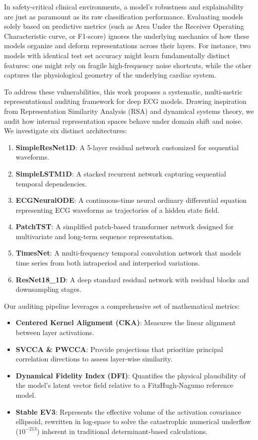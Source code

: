 \documentclass[twocolumn]{article}
\begin{document}
In safety-critical clinical environments, a model's robustness and explainability are just as paramount as its raw classification performance. Evaluating models solely based on predictive metrics (such as Area Under the Receiver Operating Characteristic curve, or F1-score) ignores the underlying mechanics of how these models organize and deform representations across their layers. For instance, two models with identical test set accuracy might learn fundamentally distinct features: one might rely on fragile high-frequency noise shortcuts, while the other captures the physiological geometry of the underlying cardiac system.

To address these vulnerabilities, this work proposes a systematic, multi-metric representational auditing framework for deep ECG models. Drawing inspiration from Representation Similarity Analysis (RSA) and dynamical systems theory, we audit how internal representation spaces behave under domain shift and noise. We investigate six distinct architectures:
\begin{enumerate}
    \item \textbf{SimpleResNet1D}: A 5-layer residual network customized for sequential waveforms.
    \item \textbf{SimpleLSTM1D}: A stacked recurrent network capturing sequential temporal dependencies.
    \item \textbf{ECGNeuralODE}: A continuous-time neural ordinary differential equation representing ECG waveforms as trajectories of a hidden state field.
    \item \textbf{PatchTST}: A simplified patch-based transformer network designed for multivariate and long-term sequence representation.
    \item \textbf{TimesNet}: A multi-frequency temporal convolution network that models time series from both intraperiod and interperiod variations.
    \item \textbf{ResNet18\_1D}: A deep standard residual network with residual blocks and downsampling stages.
\end{enumerate}

Our auditing pipeline leverages a comprehensive set of mathematical metrics:
\begin{itemize}
    \item \textbf{Centered Kernel Alignment (CKA)}: Measures the linear alignment between layer activations.
    \item \textbf{SVCCA \& PWCCA}: Provide projections that prioritize principal correlation directions to assess layer-wise similarity.
    \item \textbf{Dynamical Fidelity Index (DFI)}: Quantifies the physical plausibility of the model's latent vector field relative to a FitzHugh-Nagumo reference model.
    \item \textbf{Stable EV3}: Represents the effective volume of the activation covariance ellipsoid, rewritten in log-space to solve the catastrophic numerical underflow ($10^{-213}$) inherent in traditional determinant-based calculations.
\end{itemize}
\end{document}
